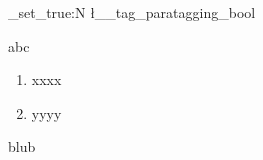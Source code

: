 \documentclass{article}
\newcommand\parataggingON {\bool_set_true:N \l__tag_paratagging_bool}
\begin{document}
\pagestyle{empty}

\parataggingON

abc

\begin{enumerate}
\item xxxx %

\item yyyy
\end{enumerate}

blub
\end{document}
